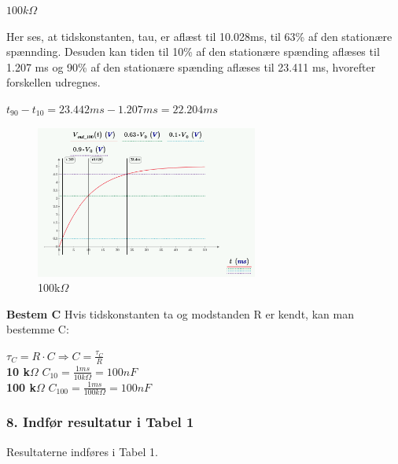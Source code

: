 \textbf{$100k\Omega$}

Her ses, at tidskonstanten, tau, er aflæst til 10.028ms, til 63\% af den stationære spænnding.
Desuden kan tiden til 10\% af den stationære spænding aflæses til 1.207 ms og 90\% af den stationære spænding aflæses til 23.411 ms, hvorefter forskellen udregnes.
\begin{center}

$t_{90}-t_{10}=23.442ms-1.207ms=22.204ms$

\end{center}


\begin{figure}[h]
\begin{center}
\includegraphics[height=5cm]{M_Fig/Ana_1_tau_100ohm}
\caption{100k$\Omega$}
\label{tr1_10k}
\end{center}
\end{figure}

\textbf{Bestem C}
Hvis tidskonstanten ta og modstanden R er kendt, kan man bestemme C:

\begin{center}
$\tau_{C}=R \cdot C \Rightarrow C=\frac{\tau_{C}}{R}$\\
\textbf{10 k$\Omega$}
$C_{10}=\frac{1ms}{10k\Omega}=100nF$\\
\textbf{100 k$\Omega$}
$C_{100}=\frac{1ms}{100k\Omega}=100nF$
 
\end{center}






\subsubsection*{8. Indfør resultatur i Tabel 1}
Resultaterne indføres i Tabel 1.





